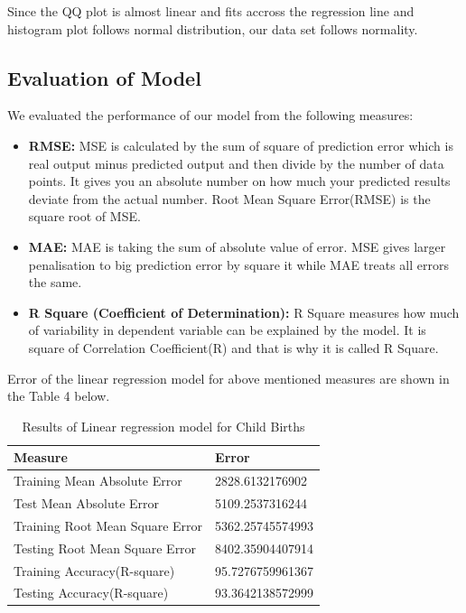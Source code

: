 \documentclass[12pt]{article}
\begin{document}
Since the QQ plot is almost linear and fits accross the regression line and histogram plot follows normal distribution, our data set follows normality.

\pagebreak
\subsection{Evaluation of Model}

We evaluated the performance of our model from the following measures:
\begin{itemize}
	\item \textbf{RMSE:} MSE is calculated by the sum of square of prediction error which is real output minus predicted output and then divide by the number of data points. It gives you an absolute number on how much your predicted results deviate from the actual number. Root Mean Square Error(RMSE) is the square root of MSE. 
	\item \textbf{MAE:} MAE is taking the sum of absolute value of error.  MSE gives larger penalisation to big prediction error by square it while MAE treats all errors the same.
	\item \textbf{R Square (Coefficient of Determination):} R Square measures how much of variability in dependent variable can be explained by the model. It is square of Correlation Coefficient(R) and that is why it is called R Square.
\end{itemize}

Error of the linear regression model for above mentioned measures are shown in the Table 4 below.

\begin{table}[h]
\caption{Results of Linear regression model for Child Births }
\vspace{10pt}
\centering
\begin{tabular}{|l|l|}
\hline
\textbf{Measure }                        & \textbf{Error }           \\ \hline
Training Mean Absolute Error    & 2828.6132176902  \\
Test Mean Absolute Error        & 5109.2537316244  \\
Training Root Mean Square Error & 5362.25745574993 \\
Testing Root Mean Square Error  & 8402.35904407914 \\
Training Accuracy(R-square)     & 95.7276759961367 \\
Testing Accuracy(R-square)      & 93.3642138572999 \\ \hline
\end{tabular}
\end{table}
\end{document}
